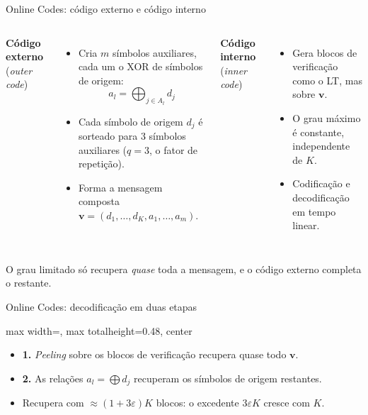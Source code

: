 \documentclass[aspectratio=169,10pt]{beamer}
\newcommand{\figura}[2][0.72]{%
	\begin{adjustbox}{max width=\textwidth, max totalheight=#1\textheight, center}\end{adjustbox}}
\newenvironment{topicos}{\begin{itemize}\setlength{\itemsep}{0.7em}}{\end{itemize}}
\begin{document}
\begin{frame}{Online Codes: código externo e código interno}
	\begin{columns}[T, onlytextwidth]
		\textbf{Código externo} (\emph{outer code})
		\begin{itemize}\setlength{\itemsep}{0.4em}
			\item Cria $m$ símbolos auxiliares, cada um o XOR de símbolos de origem:
			\[ a_l = \bigoplus_{j \in A_l} d_j \]
			\item Cada símbolo de origem $d_j$ é sorteado para \alert{3 símbolos auxiliares} ($q = 3$, o fator de repetição).
			\item Forma a mensagem composta $\mathbf{v} = (d_1, \ldots, d_K, a_1, \ldots, a_m)$.
		\end{itemize}
		\textbf{Código interno} (\emph{inner code})
		\begin{itemize}\setlength{\itemsep}{0.4em}
			\item Gera blocos de verificação como o LT, mas sobre $\mathbf{v}$.
			\item O grau máximo é \alert{constante}, independente de $K$.
			\item Codificação e decodificação em tempo \alert{linear}.
		\end{itemize}
	\end{columns}
	\vfill
	\centering
	O grau limitado só recupera \emph{quase} toda a mensagem, e o código externo completa o restante.
\end{frame}

\begin{frame}{Online Codes: decodificação em duas etapas}
	\figura[0.48]{../thesis/img/tikz/online_codes}
	\vfill
	\begin{topicos}
		\item \textbf{1.} \emph{Peeling} sobre os blocos de verificação recupera quase todo $\mathbf{v}$.
		\item \textbf{2.} As relações $a_l = \bigoplus d_j$ recuperam os símbolos de origem restantes.
		\item Recupera com $\approx (1 + 3\varepsilon)K$ blocos: o excedente $3\varepsilon K$ \alert{cresce com $K$}.
	\end{topicos}
\end{frame}
\end{document}
